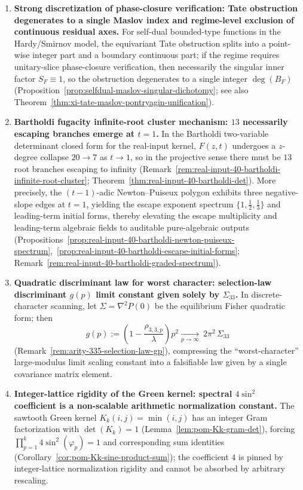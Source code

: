 \begin{enumerate}
  \item \textbf{Strong discretization of phase-closure verification: Tate obstruction degenerates to a single Maslov index and regime-level exclusion of continuous residual axes.}
  For self-dual bounded-type functions in the Hardy/Smirnov model, the equivariant Tate obstruction splits into a point-wise integer part and a boundary continuous part; if the regime requires unitary-slice phase-closure verification, then necessarily the singular inner factor \(S_F\equiv 1\), so the obstruction degenerates to a single integer \(\deg(B_F)\) (Proposition~\ref{prop:selfdual-maslov-singular-dichotomy}; see also Theorem~\ref{thm:xi-tate-maslov-pontryagin-unification}).

  \item \textbf{Bartholdi fugacity infinite-root cluster mechanism: \texorpdfstring{$13$}{13} necessarily escaping branches emerge at \texorpdfstring{$t=1$}{t=1}.}
  In the Bartholdi two-variable determinant closed form for the real-input kernel, \(F(z,t)\) undergoes a \(z\)-degree collapse \(20\to 7\) as \(t\to 1\), so in the projective sense there must be \(13\) root branches escaping to infinity (Remark~\ref{rem:real-input-40-bartholdi-infinite-root-cluster}; Theorem~\ref{thm:real-input-40-bartholdi-det}).
  More precisely, the \((t-1)\)-adic Newton--Puiseux polygon exhibits three negative-slope edges at \(t=1\), yielding the escape exponent spectrum \(\{1,\tfrac12,\tfrac13\}\) and leading-term initial forms, thereby elevating the escape multiplicity and leading-term algebraic fields to auditable pure-algebraic outputs (Propositions~\ref{prop:real-input-40-bartholdi-newton-puiseux-spectrum},~\ref{prop:real-input-40-bartholdi-escape-initial-forms}; Remark~\ref{rem:real-input-40-bartholdi-graded-spectrum}).

  \item \textbf{Quadratic discriminant law for worst character: selection-law discriminant \texorpdfstring{$g(p)$}{g(p)} limit constant given solely by \texorpdfstring{$\Sigma_{33}$}{Sigma33}.}
  In discrete-character scanning, let \(\Sigma=\nabla^2P(0)\) be the equilibrium Fisher quadratic form; then
  \[
  g(p):=\left(1-\frac{\rho_{3,3,p}}{\lambda}\right)p^2
  \xrightarrow[p\to\infty]{}\ 2\pi^2\,\Sigma_{33}
  \]
  (Remark~\ref{rem:arity-335-selection-law-gp}), compressing the ``worst-character'' large-modulus limit scaling constant into a falsifiable law given by a single covariance matrix element.

  \item \textbf{Integer-lattice rigidity of the Green kernel: spectral \texorpdfstring{$4\sin^2$}{4 sin^2} coefficient is a non-scalable arithmetic normalization constant.}
  The sawtooth Green kernel \(K_k(i,j)=\min(i,j)\) has an integer Gram factorization with \(\det(K_k)=1\) (Lemma~\ref{lem:pom-Kk-gram-det}), forcing
  \(\prod_{p=1}^k 4\sin^2(\varphi_p)=1\)
  and corresponding sum identities (Corollary~\ref{cor:pom-Kk-sine-product-sum});
  the coefficient \(4\) is pinned by integer-lattice normalization rigidity and cannot be absorbed by arbitrary rescaling.
\end{enumerate}

